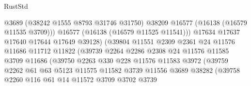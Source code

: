\begin{lexlean}{RustStd}
\begin{coremodule}
                                      @3689
                                      (@38242 @1555 @8793 @31746 @31750)
                                      @38209
                                      @16577
                                      (@16138 (@16579 @11535 @3709)))
                                    @16577
                                    (@16138 (@16579 @11525 @11541)))
                                  @17634
                                  @17637
                                  @17640
                                  @17644
                                  @17649
                                  @39128)
                                (@39804
                                  @11551
                                  @2309
                                  @2361
                                  @24
                                  @11576
                                  @11686
                                  @11712
                                  @11822
                                  (@39739
                                    @2264
                                    @2286
                                    @2308
                                    @24
                                    @11576
                                    @11585
                                    @3709
                                    @11686
                                    (@39750
                                      @2263
                                      @330
                                      @228
                                      @11576
                                      @11583
                                      @3972
                                      (@39759
                                        @2262
                                        @61
                                        @63
                                        @5123
                                        @11575
                                        @11582
                                        @3739
                                        @11556
                                        @3689
                                        @38282
                                        (@39758
                                          @2260
                                          @116
                                          @61
                                          @14
                                          @11572
                                          @3709
                                          @3702
                                          @3739

\end{coremodule}
\end{lexlean}
